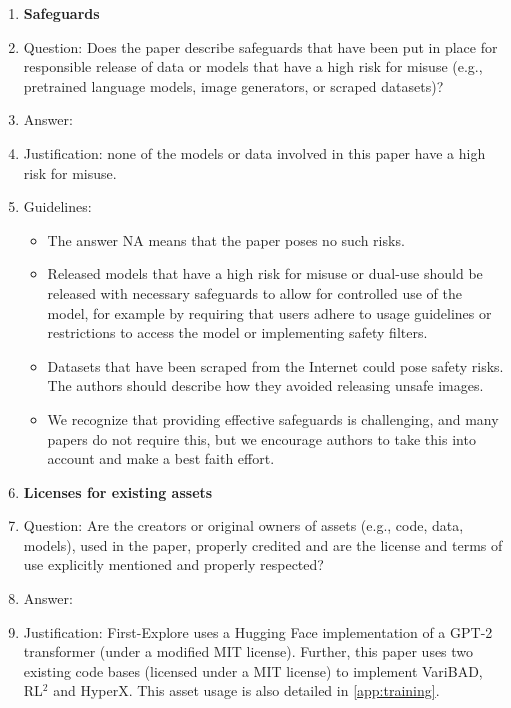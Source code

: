 \documentclass{article}
\begin{document}
\begin{enumerate}
\item {\bf Safeguards}
    \item[] Question: Does the paper describe safeguards that have been put in place for responsible release of data or models that have a high risk for misuse (e.g., pretrained language models, image generators, or scraped datasets)?
    \item[] Answer: \answerNA{} %
    \item[] Justification: none of the models or data involved in this paper have a high risk for misuse.
    \item[] Guidelines:
    \begin{itemize}
        \item The answer NA means that the paper poses no such risks.
        \item Released models that have a high risk for misuse or dual-use should be released with necessary safeguards to allow for controlled use of the model, for example by requiring that users adhere to usage guidelines or restrictions to access the model or implementing safety filters. 
        \item Datasets that have been scraped from the Internet could pose safety risks. The authors should describe how they avoided releasing unsafe images.
        \item We recognize that providing effective safeguards is challenging, and many papers do not require this, but we encourage authors to take this into account and make a best faith effort.
    \end{itemize}

\item {\bf Licenses for existing assets}
    \item[] Question: Are the creators or original owners of assets (e.g., code, data, models), used in the paper, properly credited and are the license and terms of use explicitly mentioned and properly respected?
    \item[] Answer: \answerYes{} %
    \item[] Justification: First-Explore uses a \cite{wolf2020huggingfaces} Hugging Face implementation of a \cite{radford2019language} GPT-2 transformer (under a modified MIT license). Further, this paper uses two existing code bases (licensed under a MIT license) to implement VariBAD, RL\(^2\) and HyperX. This asset usage is also detailed in \cref{app:training}.
    

\end{enumerate}
\end{document}

